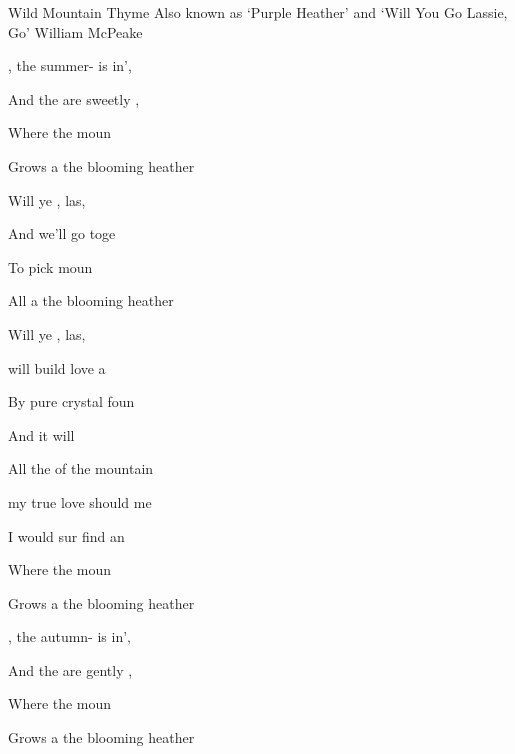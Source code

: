\begin{SBSong}{Wild Mountain Thyme}
  {Also known as `Purple Heather' and `Will You Go Lassie, Go'}
  {William McPeake}
  \begin{SBVerse}
    , the summer- is in',
    
    And the  are sweetly ,
    
    Where the  moun 
    
    Grows a the blooming heather
  \end{SBVerse}
  \begin{SBChorus}
    Will ye , las, 

    And we'll  go toge 

    To pick  moun 

    All a the blooming heather

    Will ye , las, 
  \end{SBChorus}
  \WBPageBrk
  \begin{SBVerse}
     will build  love a 

    By  pure crystal foun

    And  it  will 

    All the  of the mountain
  \end{SBVerse}
  \begin{SBVerse}
     my true love  should  me

    I would sur find an

    Where the  moun 

    Grows a the blooming heather
  \end{SBVerse}
  \begin{SBVerse}
    , the autumn- is in',
    
    And the  are gently ,
    
    Where the  moun 

    Grows a the blooming heather
  \end{SBVerse}
\end{SBSong}
